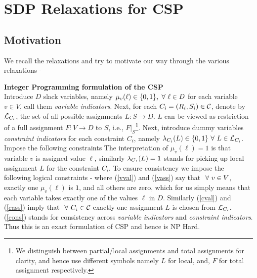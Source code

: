 \section{SDP Relaxations for CSP}

\subsection{Motivation}

We recall the relaxations and try to motivate our way through the various relaxations -
\begin{discussion}{\bf Integer Programming formulation of the CSP}\\
Introduce $D$ slack variables, namely $\mu_v(\ell) \in \{ 0, 1 \}, \ \forall \  \ell \in D$ for each variable $v \in V$, call them \textit{variable indicators}. 
Next, for each $C_i=(R_i,S_i)\in \mathcal{C}$, denote by $\mathcal{L}_{C_i}$, the set of all possible assignments $L : S \rightarrow D$. 
$L$ can be viewed as restriction of a full assignment $F: V \rightarrow D$ to $S$, i.e., $F|_S$\footnote{We distinguish between partial/local assignments and total assignments for clarity, and hence use different symbols namely $L$ for local, and, $F$ for total assignment respectively.}. 
Next, introduce dummy variables \textit{constraint indicators} for each constraint $C_i$, namely $\lambda_{C_i}(L) \in \{ 0, 1\} \ \forall \  L \in \mathcal{L}_{C_i}$. 
Impose the following constraints 
The interpretation of $\mu_v(\ell)=1$ is that variable $v$ is assigned value $\ell$, similarly $\lambda_{C_I}(L)=1$ stands for picking up local assignment $L$ for the constraint $C_i$. 
To ensure consistency we impose the following logical constraints -
  where (\ref{vval}) and (\ref{vass}) say that $\ \forall \  v \in V$, exactly one $\mu_v(\ell)$ is $1$, and all others are zero, which for us simply means that each variable takes exactly one of the values $\ell$ in $D$. 
Similarly (\ref{cval}) and (\ref{cass}) imply that $\ \forall \  C_i \in \mathcal{C}$ exactly one assignment $L$ is chosen from $\mathcal{L}_{C_i}$. 
(\ref{cons}) stands for consistency across \textit{variable indicators} and \textit{constraint indicators}.
Thus this is an exact formulation of CSP and hence is NP Hard. 
\end{discussion}

